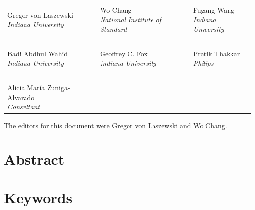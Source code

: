 \begin{center}
\parindent0pt 
\begin{tabular}{p{}p{}p{}}
 \makecell[l]{Gregor von Laszewski\\{\it Indiana University}} &
 \makecell[l]{Wo Chang\\{\it National Institute of Standard}} &
 \makecell[l]{Fugang Wang\\{\it Indiana University}}  \\
\multicolumn{3}{c}{~} \\
 \makecell[l]{Badi Abdhul Wahid\\{\it Indiana University}} & 
 \makecell[l]{Geoffrey C. Fox\\{\it Indiana University}} &
 \makecell[l]{Pratik Thakkar\\{\it Philips}} \\
\multicolumn{3}{c}{~} \\
 \makecell[l]{Alicia María Zuniga-Alvarado\\{\it Consultant}} &
 \makecell[l]{~\\~} & 
 \makecell[l]{~\\~} \\
\end{tabular}
\end{center}

\parindent0pt The editors for this document were Gregor von Laszewski and Wo Chang.

\newpage

\section*{\hfil \hspace{4cm} Abstract \hfil}
\ABSTRACT

\section*{\hfil  \hspace{4cm} Keywords \hfil}
\KEYWORDS

\newpage



\newpage

%  
  



\newpage

\tableofcontents

\listoffigures

\listoftables

\listoflistings
 
